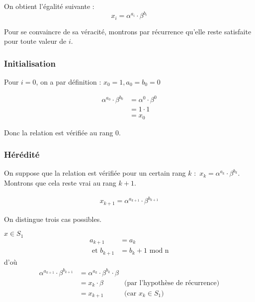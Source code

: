         On obtient l'égalité suivante :
        \begin{equation} \label{eq:1}
          x_i = \alpha^{a_i} \cdot \beta^{b_i}
        \end{equation}

        Pour se convaincre de sa véracité, montrons par récurrence qu'elle reste satisfaite pour toute valeur de $i$.

        \subsubsection{Initialisation}

        Pour $i = 0$, on a par définition : $x_0 = 1, a_0 = b_0 = 0$

        \begin{align*}
          \alpha^{a_0} \cdot \beta^{b_0} &= \alpha^{0} \cdot \beta^{0} \\
                                         &= 1 \cdot 1 \\
                                         &= x_0
        \end{align*}

        Donc la relation est vérifiée au rang 0.

        \subsubsection{Hérédité}

        On suppose que la relation est vérifiée pour un certain rang $k$ : $x_k = \alpha^{a_k} \cdot \beta^{b_k}$. Montrons que cela reste vrai au rang $k + 1$.

        \begin{align*}
          x_{k+1} = \alpha^{a_{k+1}} \cdot \beta^{b_{k+1}}
        \end{align*}

        On distingue trois cas possibles.

        \underline{$x \in S_1$}
        \begin{align*}
          a_{k+1} &= a_k \\
          \text{ et } b_{k+1} &= b_k + 1 \text{ mod n}
        \end{align*}
        d'où
        \begin{align*}
          \alpha^{a_{k+1}} \cdot \beta^{b_{k+1}} &= \alpha^{a_k} \cdot \beta^{b_k} \cdot \beta \\
                                                 &= x_k \cdot \beta & \text{(par l'hypothèse de récurrence)} \\
                                                 &= x_{k+1} & \text{(car $x_k \in S_1$)}
        \end{align*}


